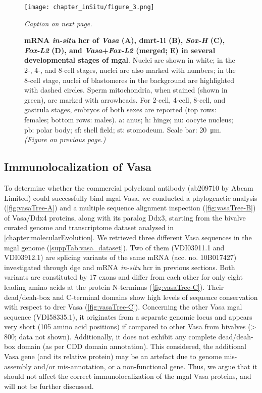 \begin{figure}
	\centering
	\texttt{[image: chapter\_inSitu/figure\_3.png]}
	\caption{\textit{Caption on next page.}}
	\label{fig:hcr}
\end{figure}

\begingroup
\captionsetup[figure]{format=hruleformat}
\begin{figure}\ContinuedFloat
	\caption[]
	{
		\textbf{mRNA \textit{in-situ} \gls{hcr} of \textit{Vasa} (A), \gls{dmrt-1l} (B), \textit{Sox-H} (C), \textit{Fox-L2} (D), and \textit{Vasa}+\textit{Fox-L2} (merged; E) in several developmental stages of \gls{mgal}}. Nuclei are shown in white; in the 2-, 4-, and 8-cell stages, nuclei are also marked with numbers; in the 8-cell stage, nuclei of blastomeres in the background are highlighted with dashed circles. Sperm mitochondria, when stained (shown in green), are marked with arrowheads. For 2-cell, 4-cell, 8-cell, and gastrula stages, embryos of both sexes are reported (top rows: females; bottom rows: males). a: anus; h: hinge; nu: oocyte nucleus; pb: polar body; sf: shell field; st: stomodeum. Scale bar: \qty{20}{\um}. \textit{(Figure on previous page.)}
	}
\end{figure}
\endgroup

\subsection{Immunolocalization of Vasa}
To determine whether the commercial polyclonal antibody (ab209710 by Abcam Limited) could successfully bind \gls{mgal} Vasa, we conducted a phylogenetic analysis (\cref{fig:vasaTree-A}) and a multiple sequence alignment inspection (\cref{fig:vasaTree-B}) of Vasa/Ddx4 proteins, along with its paralog Ddx3, starting from the bivalve curated genome and transcriptome dataset analysed in \cref{chapter:molecularEvolution}. We retrieved three different Vasa sequences in the \gls{mgal} genome (\cref{suppTab:vasa_dataset}). Two of them (VDI03911.1 and VDI03912.1) are splicing variants of the same mRNA (acc. no. 10B017427) investigated through \gls{dge} and mRNA \textit{in-situ} \gls{hcr} in previous sections. Both variants are constituted by 17 exons and differ from each other for only eight leading amino acids at the protein N-terminus (\cref{fig:vasaTree-C}). Their \gls{dead/deah-box} and C-terminal domains show high levels of sequence conservation with respect to \gls{drer} Vasa (\cref{fig:vasaTree-C}). Concerning the other Vasa \gls{mgal} sequence (VDI58335.1), it originates from a separate genomic locus and appears very short (105 amino acid positions) if compared to other Vasa from bivalves (\num{> 800}; data not shown). Additionally, it does not exhibit any complete \gls{dead/deah-box} domain (as per CDD domain annotation). This considered, the additional Vasa gene (and its relative protein) may be an artefact due to genome mis-assembly and/or mis-annotation, or a non-functional gene. Thus, we argue that it should not affect the correct immunolocalization of the \gls{mgal} Vasa proteins, and will not be further discussed.

